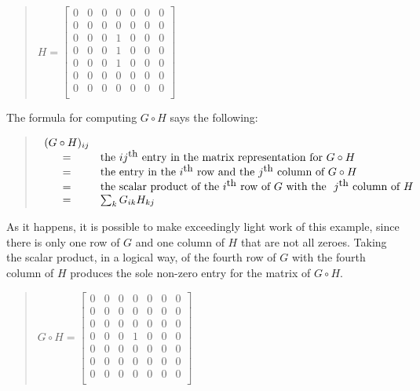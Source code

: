 \documentclass[12pt]{article}
\begin{document}
\begin{quote}$H =
\left[\begin{array}{ccccccc}
0 & 0 & 0 & 0 & 0 & 0 & 0 \\
0 & 0 & 0 & 0 & 0 & 0 & 0 \\
0 & 0 & 0 & 1 & 0 & 0 & 0 \\
0 & 0 & 0 & 1 & 0 & 0 & 0 \\
0 & 0 & 0 & 1 & 0 & 0 & 0 \\
0 & 0 & 0 & 0 & 0 & 0 & 0 \\
0 & 0 & 0 & 0 & 0 & 0 & 0 \\
\end{array}\right]$\end{quote}

The formula for computing $G \circ H$ says the following:

\begin{quote}$\begin{array}{cl}
(G \circ H)_{ij} \\
= & \mbox{the}\ ij^{\mbox{\small{th}}}\ \mbox{entry in the matrix representation for}\ G \circ H \\
= & \mbox{the entry in the}\ i^{\mbox{\small{th}}}\ \mbox{row and the}\ j^{\mbox{\small{th}}}\ \mbox{column of}\ G \circ H \\
= & \mbox{the scalar product of the}\ i^{\mbox{\small{th}}}\ \mbox{row of}\ G\ \mbox{with the }\ j^{\mbox{\small{th}}}\ \mbox{column of}\ H \\
= & \sum_{k} G_{ik} H_{kj} \\
\end{array}$\end{quote}

As it happens, it is possible to make exceedingly light work of this example, since there is only one row of $G$ and one column of $H$ that are not all zeroes.  Taking the scalar product, in a logical way, of the fourth row of $G$ with the fourth column of $H$ produces the sole non-zero entry for the matrix of $G \circ H$.

\begin{quote}$G \circ H =
\left[\begin{array}{ccccccc}
0 & 0 & 0 & 0 & 0 & 0 & 0 \\
0 & 0 & 0 & 0 & 0 & 0 & 0 \\
0 & 0 & 0 & 0 & 0 & 0 & 0 \\
0 & 0 & 0 & 1 & 0 & 0 & 0 \\
0 & 0 & 0 & 0 & 0 & 0 & 0 \\
0 & 0 & 0 & 0 & 0 & 0 & 0 \\
0 & 0 & 0 & 0 & 0 & 0 & 0 \\
\end{array}\right]$\end{quote}

\end{document}
